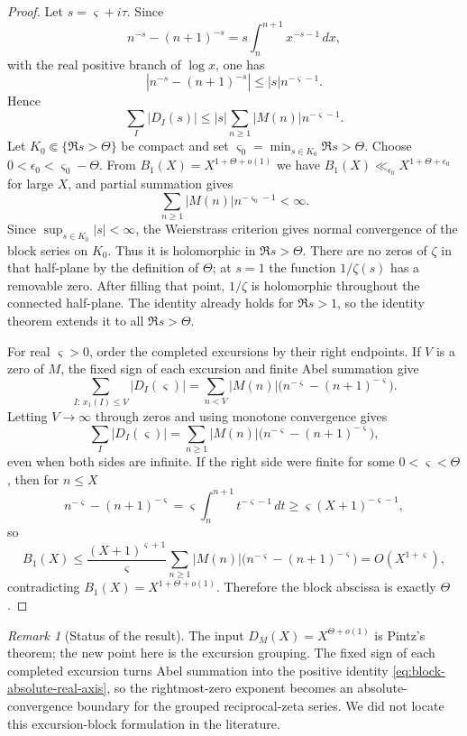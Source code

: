 \documentclass[11pt]{amsart}
\numberwithin{equation}{section}
\theoremstyle{plain}
\theoremstyle{definition}
\theoremstyle{remark}
\newtheorem{remark}[theorem]{Remark}
\begin{document}
\begin{proof}
Let $s=\varsigma+i\tau$.  Since
\[
 n^{-s}-(n+1)^{-s}
 =s\int_n^{n+1}x^{-s-1}\,dx,
\]
with the real positive branch of $\log x$, one has
\[
 |n^{-s}-(n+1)^{-s}|\le |s|n^{-\varsigma-1}.
\]
Hence
\[
 \sum_I|D_I(s)|
 \le |s|\sum_{n\ge1}|M(n)|n^{-\varsigma-1}.
\]
Let $K_0\Subset\{\Re s>\Theta\}$ be compact and set
$\varsigma_0=\min_{s\in K_0}\Re s>\Theta$.  Choose
$0<\epsilon_0<\varsigma_0-\Theta$.  From
$B_1(X)=X^{1+\Theta+o(1)}$ we have
$B_1(X)\ll_{\epsilon_0}X^{1+\Theta+\epsilon_0}$ for large $X$, and partial
summation gives
\[
 \sum_{n\ge1}|M(n)|n^{-\varsigma_0-1}<\infty.
\]
Since $\sup_{s\in K_0}|s|<\infty$, the Weierstrass criterion gives normal
convergence of the block series on $K_0$.  Thus it is holomorphic in
$\Re s>\Theta$.  There are no zeros of $\zeta$ in that half-plane by the
definition of $\Theta$; at $s=1$ the function $1/\zeta(s)$ has a removable
zero.  After filling that point, $1/\zeta$ is holomorphic throughout the
connected half-plane.  The identity already holds for $\Re s>1$, so the
identity theorem extends it to all $\Re s>\Theta$.

For real $\varsigma>0$, order the completed excursions by their right
endpoints.  If $V$ is a zero of $M$, the fixed sign of each excursion and
finite Abel summation give
\[
 \sum_{I:\,x_1(I)\le V}|D_I(\varsigma)|
 =\sum_{n<V}|M(n)|
 \bigl(n^{-\varsigma}-(n+1)^{-\varsigma}\bigr).
\]
Letting $V\to\infty$ through zeros and using monotone convergence gives
\begin{equation}
\label{eq:block-absolute-real-axis}
 \sum_I|D_I(\varsigma)|
 =\sum_{n\ge1}|M(n)|
 \bigl(n^{-\varsigma}-(n+1)^{-\varsigma}\bigr),
\end{equation}
even when both sides are infinite.
If the right side were finite for some $0<\varsigma<\Theta$, then for
$n\le X$
\[
 n^{-\varsigma}-(n+1)^{-\varsigma}
 =\varsigma\int_n^{n+1}t^{-\varsigma-1}\,dt
 \ge \varsigma(X+1)^{-\varsigma-1},
\]
so
\[
 B_1(X)\le
 \frac{(X+1)^{\varsigma+1}}{\varsigma}
 \sum_{n\ge1}|M(n)|
 \bigl(n^{-\varsigma}-(n+1)^{-\varsigma}\bigr)
 =O(X^{1+\varsigma}),
\]
contradicting $B_1(X)=X^{1+\Theta+o(1)}$.  Therefore the block abscissa is
exactly $\Theta$.
\end{proof}

\begin{remark}[Status of the result]
\label{rem:block-abscissa-status}
The input $D_M(X)=X^{\Theta+o(1)}$ is Pintz's theorem; the new point here is
the excursion grouping.  The fixed sign of each completed excursion turns
Abel summation into the positive identity
\eqref{eq:block-absolute-real-axis}, so the rightmost-zero exponent becomes
an absolute-convergence boundary for the grouped reciprocal-zeta series.
We did not locate this excursion-block formulation in the literature.
\end{remark}
\end{document}
